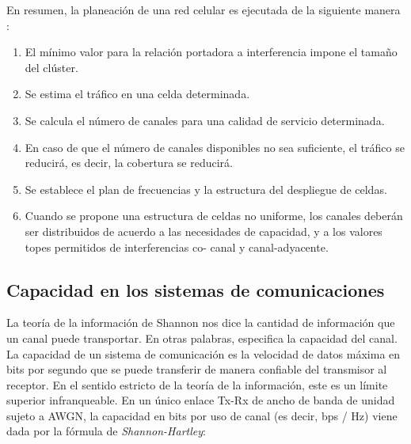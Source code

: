 En resumen, la planeación de una red celular es ejecutada de la siguiente manera \parencite{Correia2018}:
\begin{enumerate}
    \item El mínimo valor para la relación portadora a interferencia impone el tamaño del clúster.
    \item Se estima el tráfico en una celda determinada.
    \item Se calcula el número de canales para una calidad de servicio determinada.
    \item En caso de que el número de canales disponibles no sea suficiente, el tráfico se reducirá, es decir, la cobertura se reducirá.
    \item Se establece el plan de frecuencias y la estructura del despliegue de celdas.
    \item Cuando se propone una estructura de celdas no uniforme, los canales deberán ser distribuidos de acuerdo a las necesidades de capacidad, y a los valores topes permitidos de interferencias co- canal y canal-adyacente.
\end{enumerate}
\subsection{Capacidad en los sistemas de comunicaciones}

La teoría de la información de Shannon nos dice la cantidad de información que un canal puede transportar. En otras palabras, especifica la capacidad del canal. La capacidad de un sistema de comunicación es la velocidad de datos máxima en bits por segundo que se puede transferir de manera confiable del transmisor al receptor. En el sentido estricto de la teoría de la información, este es un límite superior infranqueable. En un único enlace Tx-Rx de ancho de banda de unidad sujeto a AWGN, la capacidad en bits por uso de canal (es decir, bps / Hz) viene dada por la fórmula de \emph{Shannon-Hartley}:\newline

